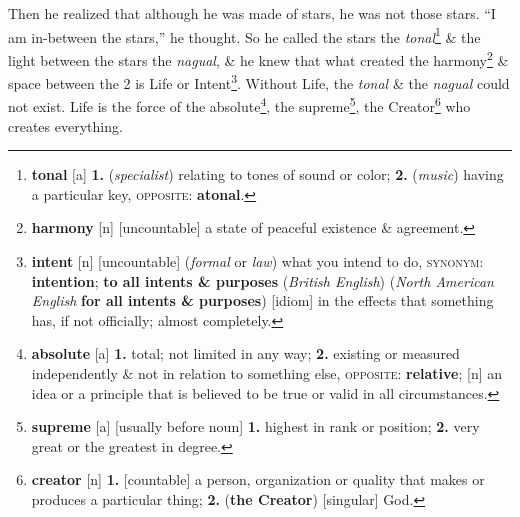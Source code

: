 \documentclass[oneside]{book}
\numberwithin{equation}{section}
\begin{document}
Then he realized that although he was made of stars, he was not those stars. ``I am in-between the stars,'' he thought. So he called the stars the \textit{tonal}\footnote{\textbf{tonal} [a] \textbf{1.} (\textit{specialist}) relating to tones of sound or color; \textbf{2.} (\textit{music}) having a particular key, \textsc{opposite}: \textbf{atonal}.} \& the light between the stars the \textit{nagual}, \& he knew that what created the harmony\footnote{\textbf{harmony} [n] [uncountable] a state of peaceful existence \& agreement.} \& space between the 2 is Life or Intent\footnote{\textbf{intent} [n] [uncountable] (\textit{formal} or \textit{law}) what you intend to do, \textsc{synonym}: \textbf{intention}; \textbf{to all intents \& purposes} (\textit{British English}) (\textit{North American English} \textbf{for all intents \& purposes}) [idiom] in the effects that something has, if not officially; almost completely.}. Without Life, the \textit{tonal} \& the \textit{nagual} could not exist. Life is the force of the absolute\footnote{\textbf{absolute} [a] \textbf{1.} total; not limited in any way; \textbf{2.} existing or measured independently \& not in relation to something else, \textsc{opposite}: \textbf{relative}; [n] an idea or a principle that is believed to be true or valid in all circumstances.}, the supreme\footnote{\textbf{supreme} [a] [usually before noun] \textbf{1.} highest in rank or position; \textbf{2.} very great or the greatest in degree.}, the Creator\footnote{\textbf{creator} [n] \textbf{1.} [countable] a person, organization or quality that makes or produces a particular thing; \textbf{2.} (\textbf{the Creator}) [singular] God.} who creates everything.
\end{document}
